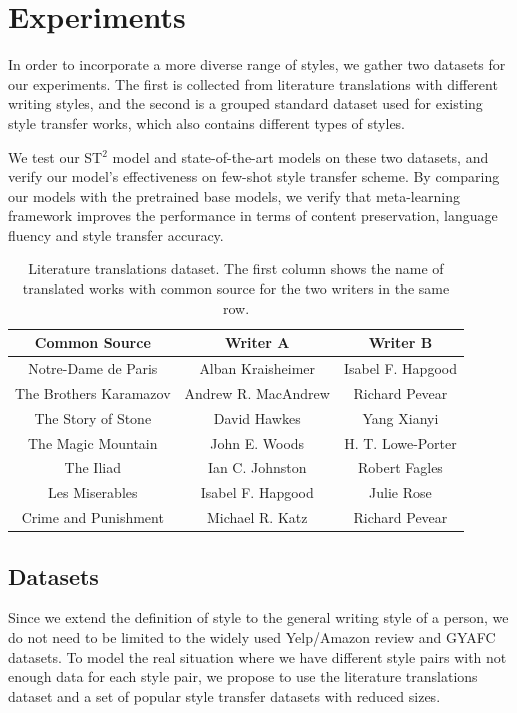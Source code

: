 \section{Experiments}
\label{sec:eval}

In order to incorporate a more diverse range of styles, we gather two datasets for our experiments. The first is collected from literature translations with different writing styles, and the second is a grouped standard dataset used for existing style transfer works, which also contains different types of styles.

We test our ST$^2$ model and state-of-the-art models on these two datasets, and verify our model's effectiveness on few-shot style transfer scheme. By comparing our models with the pretrained base models, we verify that meta-learning framework improves the performance 
in terms of content preservation, language fluency and style transfer accuracy.

\begin{table}[th]\footnotesize
	\centering
	\begin{tabular}{c|cc}
		\hline
		\textbf{Common Source} & \textbf{Writer A} & \textbf{Writer B} \\
		\hline
		Notre-Dame de Paris & Alban Kraisheimer & Isabel F. Hapgood \\
		The Brothers Karamazov & Andrew R. MacAndrew & Richard Pevear \\
		The Story of Stone & David Hawkes & Yang Xianyi \\
		The Magic Mountain & John E. Woods & H. T. Lowe-Porter \\
		The Iliad & Ian C. Johnston & Robert Fagles \\
		Les Miserables & Isabel F. Hapgood & Julie Rose \\
		Crime and Punishment & Michael R. Katz & Richard Pevear \\
		\hline
	\end{tabular}
	\caption{Literature translations dataset. The first column shows the name of translated works with common source for the two writers in the same row.}\label{tb:translations}
\end{table}

\subsection{Datasets}

Since we extend the definition of style to the general writing style of a person, we do not need to be limited to the widely used Yelp/Amazon review and GYAFC datasets. To model the real situation where we have different style pairs with not enough data for each style pair, we propose to use the literature translations dataset and a set of popular style transfer datasets with reduced sizes.

